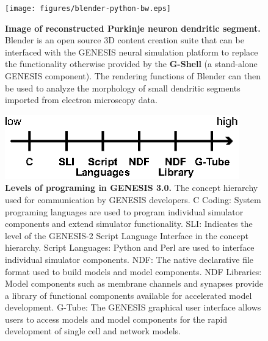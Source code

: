 \documentclass[10pt]{article}
\begin{document}
\clearpage

\begin{figure}[ht]
\begin{center}
\texttt{[image: figures/blender-python-bw.eps]}
\end{center}
\caption{
{\bf Image of reconstructed Purkinje neuron dendritic segment.} Blender is an open source 3D content creation suite that can be interfaced with the GENESIS neural simulation platform to replace the functionality otherwise provided by the {\bf G-Shell} (a stand-alone GENESIS component). The rendering functions of Blender can then be used to analyze the morphology of small dendritic segments imported from electron microscopy data.
}
\label{fig:cbi-blender}
\end{figure}

\clearpage

\begin{figure}[ht]
\begin{center}
\includegraphics[width=4in]{figures/g3-interfacing.eps}
\end{center}
\caption{
{\bf Levels of programing in GENESIS 3.0.} The concept hierarchy used for communication by GENESIS developers. C Coding: System programing languages are used to program individual simulator components and extend simulator functionality. SLI: Indicates the level of the GENESIS-2 Script Language Interface in the concept hierarchy. Script Languages: Python and Perl are used to interface individual simulator components. NDF: The native declarative file format used to build models and model components. NDF Libraries: Model components such as membrane channels and synapses provide a library of functional components available for accelerated model development. G-Tube: The GENESIS graphical user interface allows users to access models and model components for the rapid development of single cell and network models.
}
\label{fig:g3-interfacing}
\end{figure}

\clearpage
\end{document}
